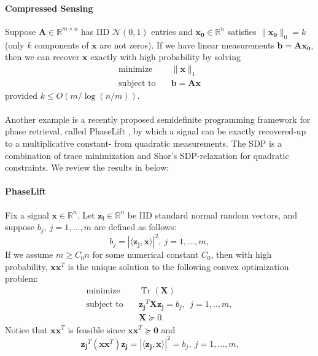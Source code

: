 \documentclass[11pt]{article}
\newcommand{\<}{\langle}
\renewcommand{\>}{\rangle}
\newcommand{\vct}[1]{\bm{#1}}
\newcommand{\mtx}[1]{\bm{#1}}
\newcommand{\tr}{\operatorname{Tr}}
\numberwithin{equation}{section}
\begin{document}
\paragraph{Compressed Sensing}
Suppose $\mtx{A} \in \mathbb{R}^{m \times n}$ has IID $\mathcal{N}(0,1)$ entries and $\vct{x_0} \in \mathbb{R}^n$ satisfies 
$\|\vct{x_0}\|_0=k$ (only $k$ components of $\vct{x}$ are not zeros). If we have linear measurements $\vct{b}=\mtx{A}\vct{x_0}$, then we can recover $
\vct{x}$ 
exactly with high probability by solving
\begin{equation}
\label{eq:L1min}
 \begin{array}{ll}
    \text{minimize}    & \quad \|\vct{x}\|_1 \\
    \text{subject to} & \quad  \vct{b}=\mtx{A}\vct{x}
\end{array}
\end{equation}
provided $k\leq O(m/\log(n/m))$.\\
\\
Another example is a recently proposed semidefinite programming framework for phase retrieval, called PhaseLift \cite
{PhaseLift2}, by which a signal can be exactly recovered-up to a multiplicative constant- from quadratic measurements. The SDP is a combination of 
trace minimization and Shor's SDP-relaxation for quadratic constraints. We review the results in \cite{PhaseLift2, ImprovedPhaseLift} 
below:

\paragraph{PhaseLift}
Fix a signal $\vct{x} \in \mathbb{R}^{n}$. Let $\vct{z_i} \in \mathbb{R}^n$ be IID standard normal random vectors, and 
suppose $b_j, ~j=1,...,m$ are defined as follows:
\begin{equation}
\label{basic system}
b_j=|\langle \vct{z_j}, \vct{x}\rangle|^2,~j=1,...,m,
\end{equation}
If we assume $m\geq C_0n$ for some numerical constant $C_0$, then with high probability, $\vct{x}\vct{x}^T$ is the unique 
solution to the following convex optimization problem:
\begin{equation}
\label{eq:tracemin}
 \begin{array}{ll}
    \text{minimize}    &\quad  \tr(\mtx{X}) \\
    \text{subject to} & \quad  \vct{z_j}^T\mtx{X}\vct{z_j} = b_j,~~j=1,..,m,\\
                                    & \quad \mtx{X} \succeq 0. 
\end{array}
\end{equation}
Notice that $\vct{x}\vct{x}^T$ is feasible since $\vct{x}\vct{x}^T\succeq \mtx{0}$ and
\[
\vct{z_j}^T(\vct{x}\vct{x}^T)\vct{z_j}=|\langle \vct{z_j}, \vct{x}\rangle|^2=b_j, ~j=1,...,m. 
\]
\end{document}

